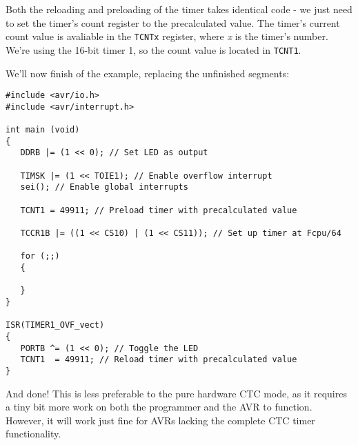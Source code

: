 \documentclass[a4paper,oneside]{book}
\begin{document}
Both the reloading and preloading of the timer takes identical code - we just need to set the timer's count register to the precalculated value. The timer's current count value is avaliable in the \texttt{TCNTx} register, where \textit{x} is the timer's number. We're using the 16-bit timer 1, so the count value is located in \texttt{TCNT1}.

We'll now finish of the example, replacing the unfinished segments:

\begin{center}
\begin{lstlisting}
#include <avr/io.h>
#include <avr/interrupt.h>

int main (void)
{
   DDRB |= (1 << 0); // Set LED as output

   TIMSK |= (1 << TOIE1); // Enable overflow interrupt
   sei(); // Enable global interrupts

   TCNT1 = 49911; // Preload timer with precalculated value

   TCCR1B |= ((1 << CS10) | (1 << CS11)); // Set up timer at Fcpu/64

   for (;;)
   {

   }
}

ISR(TIMER1_OVF_vect)
{
   PORTB ^= (1 << 0); // Toggle the LED
   TCNT1  = 49911; // Reload timer with precalculated value
} 
\end{lstlisting}
\end{center}

And done! This is less preferable to the pure hardware CTC mode, as it requires a tiny bit more work on both the programmer and the AVR to function. However, it will work just fine for AVRs lacking the complete CTC timer functionality.
\end{document}
